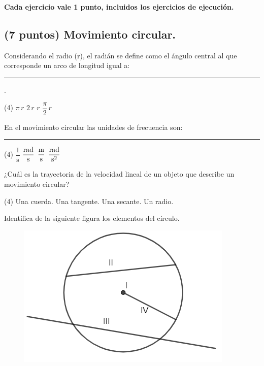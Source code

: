 \documentclass[12pt, letter]{exam}
\begin{document}


\setcounter{page}{3}

\begin{center}
\textbf{Cada ejercicio vale 1 punto, incluidos los ejercicios de ejecución.}
\end{center}

\begin{questions}

    \section{(7 puntos) Movimiento circular.}

    \question Considerando el radio (r), el radián se define como el ángulo central al que corresponde un arco de longitud igual a: \rule{2cm}{0.1mm}.
    \begin{tasks}(4)
        \task $\pi \, r$
        \task $2 \, r$
        \task $r$
        \task $\dfrac{\pi}{2} \, r$
    \end{tasks}
    \question En el movimiento circular las unidades de frecuencia son: \rule{2cm}{0.1mm}
    \begin{tasks}(4)
        \task $\dfrac{1}{\unit{\second}}$
        \task $\displaystyle \unit[per-mode=fraction]{\radian\per\second}$
        \task $\displaystyle \unit[per-mode=fraction]{\meter\per\second}$
        \task $\displaystyle \unit[per-mode=fraction]{\radian\per\square\second}$
    \end{tasks}
    \question ¿Cuál es la trayectoria de la velocidad lineal de un objeto que describe un movimiento circular?
    \begin{tasks}(4)
        \task Una cuerda.
        \task Una tangente.
        \task Una secante.
        \task Un radio.
    \end{tasks}
    \question Identifica de la siguiente figura los elementos del círculo.
    \begin{figure}[H]
        \centering
        \includegraphics[scale=1]{Elementos_Circulo_01.png}
    \end{figure}
    \begin{multicols}{2}
    \begin{parts}

\end{parts}
\end{multicols}
\end{questions}
\end{document}
